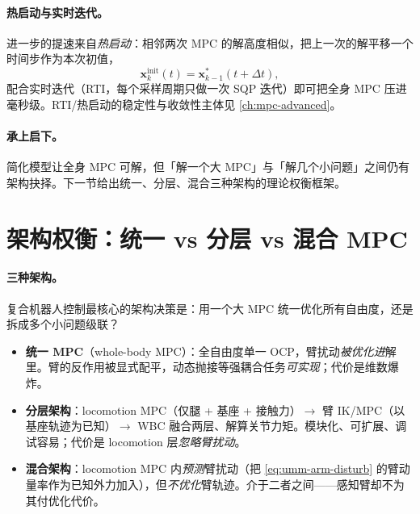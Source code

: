 \paragraph{热启动与实时迭代。}
进一步的提速来自\emph{热启动}：相邻两次 MPC 的解高度相似，把上一次的解平移一个时间步作为本次初值，
\begin{equation}
  \mathbf x_k^{\text{init}}(t)=\mathbf x_{k-1}^*(t+\Delta t),
  \label{eq:umm-warmstart}
\end{equation}
配合实时迭代（RTI，每个采样周期只做一次 SQP 迭代）即可把全身 MPC 压进毫秒级。RTI/热启动的稳定性与收敛性主体见 \cref{ch:mpc-advanced}。

\paragraph{承上启下。}
简化模型让全身 MPC 可解，但「解一个大 MPC」与「解几个小问题」之间仍有架构抉择。下一节给出统一、分层、混合三种架构的理论权衡框架。

\section{架构权衡：统一 vs 分层 vs 混合 MPC}
\label{sec:umm-arch}

\paragraph{三种架构。}
复合机器人控制最核心的架构决策是：用一个大 MPC 统一优化所有自由度，还是拆成多个小问题级联？
\begin{itemize}
  \item \textbf{统一 MPC}（whole-body MPC）：全自由度单一 OCP，臂扰动\emph{被优化进}解里。臂的反作用被显式配平，动态抛接等强耦合任务\emph{可实现}；代价是维数爆炸。
  \item \textbf{分层架构}：locomotion MPC（仅腿 + 基座 + 接触力）$\to$ 臂 IK/MPC（以基座轨迹为已知）$\to$ WBC 融合两层、解算关节力矩。模块化、可扩展、调试容易；代价是 locomotion 层\emph{忽略臂扰动}。
  \item \textbf{混合架构}：locomotion MPC 内\emph{预测}臂扰动（把 \cref{eq:umm-arm-disturb} 的臂动量率作为已知外力加入），但\emph{不优化}臂轨迹。介于二者之间——感知臂却不为其付优化代价。
\end{itemize}

